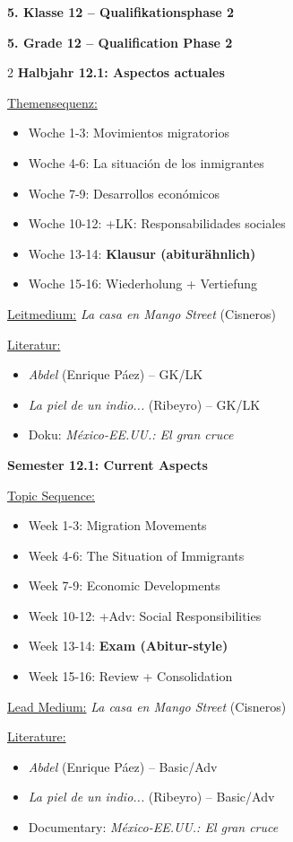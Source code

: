 \documentclass[10pt,a4paper]{article}
\newcommand{\bil}[2]{%
\begin{paracol}{2}
\small #1
\switchcolumn
\small\textcolor{english}{#2}
\end{paracol}
}
\newcommand{\secbil}[2]{%
\vspace{8pt}
\noindent\colorbox{spanisch}{\parbox{0.48\textwidth}{\color{white}\bfseries #1}}%
\hfill%
\colorbox{english}{\parbox{0.48\textwidth}{\color{white}\bfseries #2}}
\vspace{4pt}
}
\begin{document}
\vspace{4mm}

\secbil{5. Klasse 12 -- Qualifikationsphase 2}{5. Grade 12 -- Qualification Phase 2}

\bil{%
\textbf{Halbjahr 12.1: Aspectos actuales}

\underline{Themensequenz:}
\begin{itemize}[noitemsep,topsep=2pt]
\item Woche 1-3: Movimientos migratorios
\item Woche 4-6: La situación de los inmigrantes
\item Woche 7-9: Desarrollos económicos
\item Woche 10-12: +LK: Responsabilidades sociales
\item Woche 13-14: \textbf{Klausur (abiturähnlich)}
\item Woche 15-16: Wiederholung + Vertiefung
\end{itemize}

\underline{Leitmedium:} \textit{La casa en Mango Street} (Cisneros)

\underline{Literatur:}
\begin{itemize}[noitemsep,topsep=2pt]
\item \textit{Abdel} (Enrique Páez) -- GK/LK
\item \textit{La piel de un indio...} (Ribeyro) -- GK/LK
\item Doku: \textit{México-EE.UU.: El gran cruce}
\end{itemize}
}{%
\textbf{Semester 12.1: Current Aspects}

\underline{Topic Sequence:}
\begin{itemize}[noitemsep,topsep=2pt]
\item Week 1-3: Migration Movements
\item Week 4-6: The Situation of Immigrants
\item Week 7-9: Economic Developments
\item Week 10-12: +Adv: Social Responsibilities
\item Week 13-14: \textbf{Exam (Abitur-style)}
\item Week 15-16: Review + Consolidation
\end{itemize}

\underline{Lead Medium:} \textit{La casa en Mango Street} (Cisneros)

\underline{Literature:}
\begin{itemize}[noitemsep,topsep=2pt]
\item \textit{Abdel} (Enrique Páez) -- Basic/Adv
\item \textit{La piel de un indio...} (Ribeyro) -- Basic/Adv
\item Documentary: \textit{México-EE.UU.: El gran cruce}
\end{itemize}
}
\end{document}
